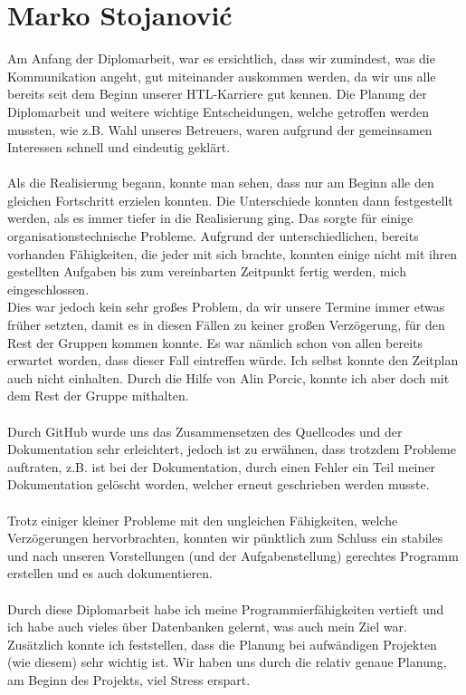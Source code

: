\documentclass[12pt,a4paper]{report}
\begin{document}
\chapter{Marko Stojanovi\'{c}}
Am Anfang der Diplomarbeit, war es ersichtlich, dass wir zumindest, was die Kommunikation angeht, gut miteinander auskommen werden, da wir uns alle bereits seit dem Beginn unserer HTL-Karriere gut kennen. Die Planung der Diplomarbeit und weitere wichtige Entscheidungen, welche getroffen werden mussten, wie z.B. Wahl unseres Betreuers, waren aufgrund der gemeinsamen Interessen schnell und eindeutig geklärt. \\\\
Als die Realisierung begann, konnte man sehen, dass nur am Beginn alle den gleichen Fortschritt erzielen konnten. Die Unterschiede konnten dann festgestellt werden, als es immer tiefer in die Realisierung ging. Das sorgte für einige organisationstechnische Probleme. Aufgrund der unterschiedlichen, bereits vorhanden Fähigkeiten, die jeder mit sich brachte, konnten einige nicht mit ihren gestellten Aufgaben bis zum vereinbarten Zeitpunkt fertig werden, mich eingeschlossen.\\
Dies war jedoch kein sehr großes Problem, da wir unsere Termine immer etwas früher setzten, damit es in diesen Fällen zu keiner großen Verzögerung, für den Rest der Gruppen kommen konnte. Es war nämlich schon von allen bereits erwartet worden, dass dieser Fall eintreffen würde. Ich selbst konnte den Zeitplan auch nicht einhalten. Durch die Hilfe von Alin Porcic, konnte ich aber doch mit dem Rest der Gruppe mithalten.\\\\
Durch GitHub wurde uns das Zusammensetzen des Quellcodes und der Dokumentation sehr erleichtert, jedoch ist zu erwähnen, dass trotzdem Probleme auftraten, z.B. ist bei der Dokumentation, durch einen Fehler ein Teil meiner Dokumentation gelöscht worden, welcher erneut geschrieben werden musste.\\\\
Trotz einiger kleiner Probleme mit den ungleichen Fähigkeiten, welche Verzögerungen hervorbrachten, konnten wir pünktlich zum Schluss ein stabiles und nach unseren Vorstellungen (und der Aufgabenstellung) gerechtes Programm erstellen und es auch dokumentieren.\\\\
Durch diese Diplomarbeit habe ich meine Programmierfähigkeiten vertieft und ich habe auch vieles über Datenbanken gelernt, was auch mein Ziel war. Zusätzlich konnte ich feststellen, dass die Planung bei aufwändigen Projekten (wie diesem) sehr wichtig ist. Wir haben uns durch die relativ genaue Planung, am Beginn des Projekts, viel Stress erspart.
\end{document}
